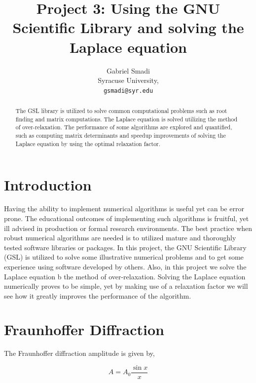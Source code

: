 \documentclass{article}
\begin{document}
\title{Project 3: Using the GNU Scientific Library and solving the Laplace equation }

\author{Gabriel Smadi\\
  Syracuse University,\\
  \texttt{gsmadi@syr.edu}}
\maketitle

\begin{abstract}
The GSL library is utilized to solve common computational problems such as root finding
and matrix computations. The Laplace equation is solved utilizing the method of over-relaxation.
The performance of some algorithms are explored and quantified, such as computing matrix determinants
and speedup improvements of solving the Laplace equation by using the optimal relaxation factor.
\end{abstract}

\section{Introduction}

Having the ability to implement numerical algorithms is useful yet can be error prone. The educational outcomes of implementing
such algorithms is fruitful, yet ill advised in production or formal research environments. The best practice when robust numerical
algorithms are needed is to utilized mature and thoroughly tested software libraries or packages. In this project, the GNU
Scientific Library (GSL) is utilized to solve some illustrative numerical problems and to get some experience using software
developed by others. Also, in this project we solve the Laplace equation b the method of over-relaxation. Solving the
Laplace equation numerically proves to be simple, yet by making use of a relaxation factor we will see how it greatly improves the
performance of the algorithm.

\section{Fraunhoffer Diffraction}

The Fraunhoffer diffraction amplitude is given by,

\begin{equation}
\label{eq:fraun_amp}
  A = A_{0}\frac{\sin{x}}{x}
\end{equation}
\end{document}
